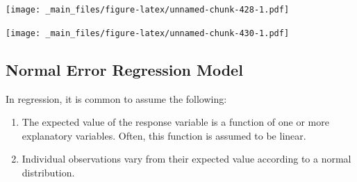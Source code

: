 \documentclass[]{book}
\newenvironment{Shaded}{\begin{snugshade}}{\end{snugshade}}
\newcommand{\KeywordTok}[1]{\textcolor[rgb]{0.13,0.29,0.53}{\textbf{#1}}}
\newcommand{\DataTypeTok}[1]{\textcolor[rgb]{0.13,0.29,0.53}{#1}}
\newcommand{\DecValTok}[1]{\textcolor[rgb]{0.00,0.00,0.81}{#1}}
\newcommand{\StringTok}[1]{\textcolor[rgb]{0.31,0.60,0.02}{#1}}
\newcommand{\OperatorTok}[1]{\textcolor[rgb]{0.81,0.36,0.00}{\textbf{#1}}}
\newcommand{\NormalTok}[1]{#1}
\begin{document}
\begin{Shaded}
\end{Shaded}

\texttt{[image: \_main\_files/figure-latex/unnamed-chunk-428-1.pdf]}

\texttt{[image: \_main\_files/figure-latex/unnamed-chunk-430-1.pdf]}

\subsection{Normal Error Regression
Model}\label{normal-error-regression-model}

In regression, it is common to assume the following:

\begin{enumerate}
\def\labelenumi{\arabic{enumi}.}
\item
  The expected value of the response variable is a function of one or
  more explanatory variables. Often, this function is assumed to be
  linear.
\item
  Individual observations vary from their expected value according to a
  normal distribution.
\end{enumerate}
\end{document}
